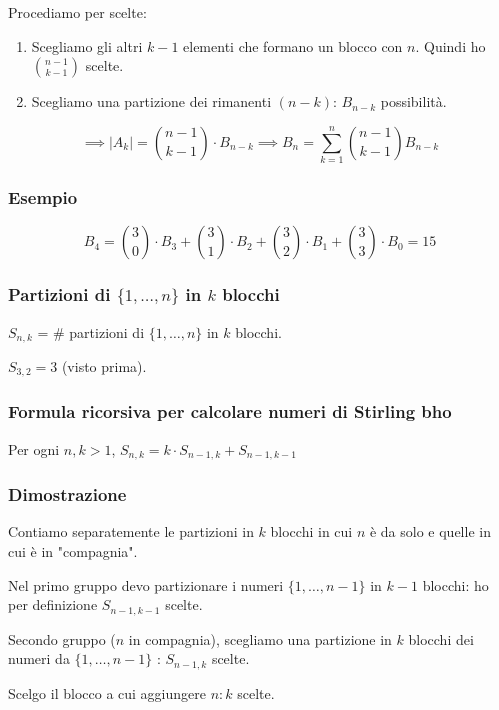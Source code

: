 \documentclass[11pt]{article}
\begin{document}
		Procediamo per scelte:

		\begin{enumerate}
			\item Scegliamo gli altri $k-1$ elementi che formano un blocco
				con $n$. Quindi ho $\binom{n-1}{k-1}$ scelte.
			\item Scegliamo una partizione dei rimanenti $(n-k)$: 
				$B_{n-k}$ possibilit\`a.
		\end{enumerate}
		
		\[
		\implies |A_k| = \binom{n-1}{k-1} \cdot B_{n-k}
		\implies B_n = \sum_{k=1}^{n}\binom{n-1}{k-1}B_{n-k}
	\]

		\subsubsection{Esempio}
		
		\[
			B_4 = \binom{3}{0} \cdot B_3 + \binom{3}{1} \cdot B_2 +
			\binom{3}{2} \cdot B_1 + \binom{3}{3} \cdot B_0 = 15
		\]
		\subsubsection{Partizioni di $\{1,\ldots,n\}$ in $k$ blocchi}

		$S_{n,k}$ = \# partizioni di $\{1,\ldots,n\}$ in $k$ blocchi.

		$S_{3,2} = 3$ (visto prima).

		\subsubsection{Formula ricorsiva per calcolare numeri di Stirling bho}

		Per ogni $n,k > 1$, $S_{n,k} = k \cdot S_{n-1,k} + S_{n-1,k-1}$

		\subsubsection{Dimostrazione}
		
		Contiamo separatemente le partizioni in $k$ blocchi in cui $n$ \`e 
		da solo e quelle in cui \`e in "compagnia".

		Nel primo gruppo devo partizionare i numeri $\{1,\ldots,n-1\}$ in $k-1$ 
		blocchi: ho per definizione $S_{n-1,k-1}$ scelte.

		Secondo gruppo ($n$ in compagnia), scegliamo una partizione in $k$
		blocchi dei numeri da $\{1,\ldots,n-1\}$ : $S_{n-1,k}$ scelte.

		Scelgo il blocco a cui aggiungere $n : k$ scelte.
\end{document}
